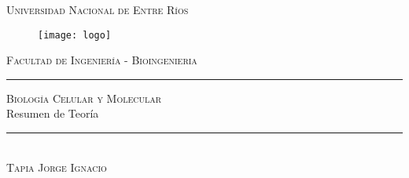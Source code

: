 \begin{titlepage}
	\begin{center}
		\centering \Huge \textsc{Universidad Nacional de Entre Ríos} \\
	\end{center}
\vspace{1cm}
	
	\begin{figure}[h]
		\centering
		\texttt{[image: logo]}	
	\end{figure}
\vspace{1.5cm}
	\centering \LARGE \textsc{Facultad de Ingeniería - Bioingenieria}
\vspace{1cm}
	
	\textcolor{blue-violet}{\rule{\linewidth}{0.75mm}}
	\vspace{1mm}
	\begin{spacing}{1.5}
		\centering \LARGE \textsc{Biología Celular y Molecular} \\
		\centering \LARGE {Resumen de Teoría}
	\end{spacing}
	\vspace{5mm}
	\textcolor{blue-violet}{\rule{\linewidth}{0.75mm}}\\
	\vspace{1cm}
	\centering \LARGE \textsc{Tapia Jorge Ignacio}
\end{titlepage}